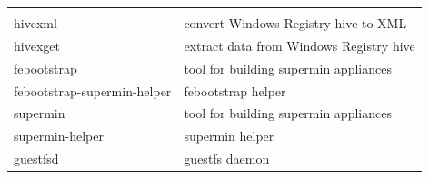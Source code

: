 \documentclass[
  14pt,
  english,
  a4paper,
]{scrreprt}
\begin{document}
\begin{longtable}[]{@{}ll@{}}
\begin{minipage}[t]{0.61\columnwidth}
\end{minipage}\tabularnewline
\begin{minipage}[t]{0.33\columnwidth}\raggedright
hivexml\strut
\end{minipage} & \begin{minipage}[t]{0.61\columnwidth}\raggedright
convert Windows Registry hive to XML\strut
\end{minipage}\tabularnewline
\begin{minipage}[t]{0.33\columnwidth}\raggedright
hivexget\strut
\end{minipage} & \begin{minipage}[t]{0.61\columnwidth}\raggedright
extract data from Windows Registry hive\strut
\end{minipage}\tabularnewline
\begin{minipage}[t]{0.33\columnwidth}\raggedright
febootstrap\strut
\end{minipage} & \begin{minipage}[t]{0.61\columnwidth}\raggedright
tool for building supermin appliances\strut
\end{minipage}\tabularnewline
\begin{minipage}[t]{0.33\columnwidth}\raggedright
febootstrap-supermin-helper\strut
\end{minipage} & \begin{minipage}[t]{0.61\columnwidth}\raggedright
febootstrap helper\strut
\end{minipage}\tabularnewline
\begin{minipage}[t]{0.33\columnwidth}\raggedright
supermin\strut
\end{minipage} & \begin{minipage}[t]{0.61\columnwidth}\raggedright
tool for building supermin appliances\strut
\end{minipage}\tabularnewline
\begin{minipage}[t]{0.33\columnwidth}\raggedright
supermin-helper\strut
\end{minipage} & \begin{minipage}[t]{0.61\columnwidth}\raggedright
supermin helper\strut
\end{minipage}\tabularnewline
\begin{minipage}[t]{0.33\columnwidth}\raggedright
guestfsd\strut
\end{minipage} & \begin{minipage}[t]{0.61\columnwidth}\raggedright
guestfs daemon\strut
\end{minipage}\tabularnewline
\bottomrule
\end{longtable}
\end{document}
